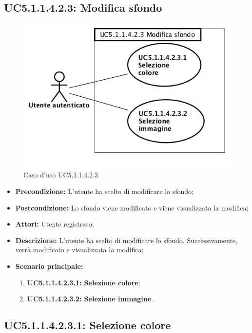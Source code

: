 \subsection{ UC5.1.1.4.2.3: Modifica sfondo}

\begin{figure}[h]
	\begin{center}
	\includegraphics[scale=0.4]{diagram/UC5-1-1-4-2-3.png}
	\caption{Caso d'uso UC5.1.1.4.2.3}
	\end{center}
\end{figure}
\begin{itemize}
	\item \textbf{Precondizione:} L'utente ha scelto di modificare lo sfondo;
	\item \textbf{Postcondizione:} Lo sfondo viene modificato e viene visualizzata la modifica;
	\item \textbf{Attori:} Utente registrato;
	\item \textbf{Descrizione:} L'utente ha scelto di modificare lo sfondo.  Successivamente, verrà modificato e visualizzata la modifica;
	\item \textbf{Scenario principale:}
	\begin{enumerate}
		\item \textbf{ UC5.1.1.4.2.3.1: Selezione colore};
		\item \textbf{ UC5.1.1.4.2.3.2: Selezione immagine}.
	\end{enumerate}
\end{itemize}
\subsection{ UC5.1.1.4.2.3.1: Selezione colore}

